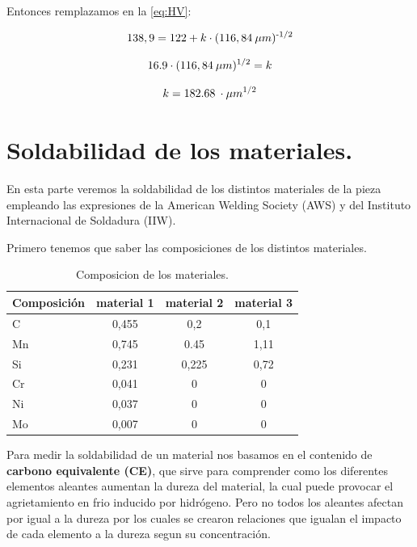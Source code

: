\documentclass[12pt,a4paper]{article}
\begin{document}
Entonces remplazamos en la \autoref{eq:HV}:

\begin{equation}
   138,9 = 122 + k\cdot (116,84\: \mu m)\textsuperscript{-1/2}
\end{equation}

\begin{equation}
       16.9\cdot (116,84\: \mu m)\textsuperscript{1/2} = k
\end{equation}

\begin{equation}
       k = 182.68\: \cdot \mu m\textsuperscript{1/2}
\end{equation}

\section{Soldabilidad de los materiales.}
En esta parte veremos la soldabilidad de los distintos materiales de la pieza empleando las expresiones de la American Welding Society
(AWS) y del Instituto Internacional de Soldadura (IIW).

Primero tenemos que saber las composiciones de los distintos materiales.

\begin{table}[h]
    \centering
    \begin{tabular}{l|c|c|c}
        \hline
        Composición & material 1 & material 2 & material 3\\
        \hline
        C & 0,455 & 0,2 & 0,1\\
        Mn & 0,745 & 0.45 & 1,11\\
        Si & 0,231 & 0,225 & 0,72\\
        Cr & 0,041 & 0 & 0\\
        Ni & 0,037 & 0 & 0\\
        Mo & 0,007 & 0 & 0\\
        \hline
    \end{tabular}
    \caption{Composicion de los materiales.}
\end{table}

Para medir la soldabilidad de un material nos basamos en el contenido de \textbf{carbono equivalente (CE)}, que sirve para comprender como los diferentes elementos aleantes aumentan la dureza del material, la cual puede provocar el agrietamiento en frio inducido por hidrógeno. Pero no todos los aleantes afectan por igual a la dureza por los cuales se crearon relaciones que igualan el impacto de cada elemento a la dureza segun su concentración.
\end{document}
